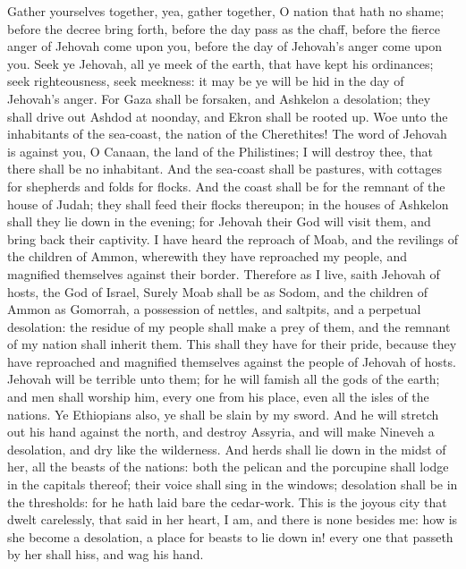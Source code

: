 Gather yourselves together, yea, gather together, O nation that hath no shame; before the decree bring forth, before the day pass as the chaff, before the fierce anger of Jehovah come upon you, before the day of Jehovah’s anger come upon you. Seek ye Jehovah, all ye meek of the earth, that have kept his ordinances; seek righteousness, seek meekness: it may be ye will be hid in the day of Jehovah’s anger.  For Gaza shall be forsaken, and Ashkelon a desolation; they shall drive out Ashdod at noonday, and Ekron shall be rooted up. Woe unto the inhabitants of the sea-coast, the nation of the Cherethites! The word of Jehovah is against you, O Canaan, the land of the Philistines; I will destroy thee, that there shall be no inhabitant. And the sea-coast shall be pastures, with cottages for shepherds and folds for flocks. And the coast shall be for the remnant of the house of Judah; they shall feed their flocks thereupon; in the houses of Ashkelon shall they lie down in the evening; for Jehovah their God will visit them, and bring back their captivity.  I have heard the reproach of Moab, and the revilings of the children of Ammon, wherewith they have reproached my people, and magnified themselves against their border. Therefore as I live, saith Jehovah of hosts, the God of Israel, Surely Moab shall be as Sodom, and the children of Ammon as Gomorrah, a possession of nettles, and saltpits, and a perpetual desolation: the residue of my people shall make a prey of them, and the remnant of my nation shall inherit them. This shall they have for their pride, because they have reproached and magnified themselves against the people of Jehovah of hosts. Jehovah will be terrible unto them; for he will famish all the gods of the earth; and men shall worship him, every one from his place, even all the isles of the nations.  Ye Ethiopians also, ye shall be slain by my sword. And he will stretch out his hand against the north, and destroy Assyria, and will make Nineveh a desolation, and dry like the wilderness. And herds shall lie down in the midst of her, all the beasts of the nations: both the pelican and the porcupine shall lodge in the capitals thereof; their voice shall sing in the windows; desolation shall be in the thresholds: for he hath laid bare the cedar-work. This is the joyous city that dwelt carelessly, that said in her heart, I am, and there is none besides me: how is she become a desolation, a place for beasts to lie down in! every one that passeth by her shall hiss, and wag his hand. 

